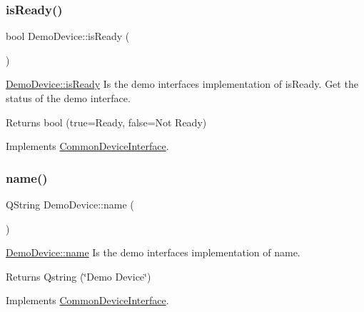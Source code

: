 \subsubsection{\texorpdfstring{is\+Ready()}{isReady()}}
{\footnotesize\ttfamily bool Demo\+Device\+::is\+Ready (\begin{DoxyParamCaption}{ }\end{DoxyParamCaption})\hspace{0.3cm}{\ttfamily [virtual]}}



\hyperlink{class_demo_device_aaadb9ced56699af55526b9fc7cf8420c}{Demo\+Device\+::is\+Ready} Is the demo interface\textquotesingle{}s implementation of is\+Ready. Get the status of the demo interface. 

\begin{DoxyReturn}{Returns}
bool (true=Ready, false=Not Ready) 
\end{DoxyReturn}


Implements \hyperlink{class_common_device_interface}{Common\+Device\+Interface}.

\hypertarget{class_demo_device_acde538bd5a71a8d4df6293876169545c}{}\label{class_demo_device_acde538bd5a71a8d4df6293876169545c} 
\subsubsection{\texorpdfstring{name()}{name()}}
{\footnotesize\ttfamily Q\+String Demo\+Device\+::name (\begin{DoxyParamCaption}{ }\end{DoxyParamCaption})\hspace{0.3cm}{\ttfamily [virtual]}}



\hyperlink{class_demo_device_acde538bd5a71a8d4df6293876169545c}{Demo\+Device\+::name} Is the demo interface\textquotesingle{}s implementation of name. 

\begin{DoxyReturn}{Returns}
Qstring (\char`\"{}\+Demo Device\char`\"{}) 
\end{DoxyReturn}


Implements \hyperlink{class_common_device_interface}{Common\+Device\+Interface}.

\hypertarget{class_demo_device_a788dd7e426fab9c8d19ea9fd106260d4}{}\label{class_demo_device_a788dd7e426fab9c8d19ea9fd106260d4} 
